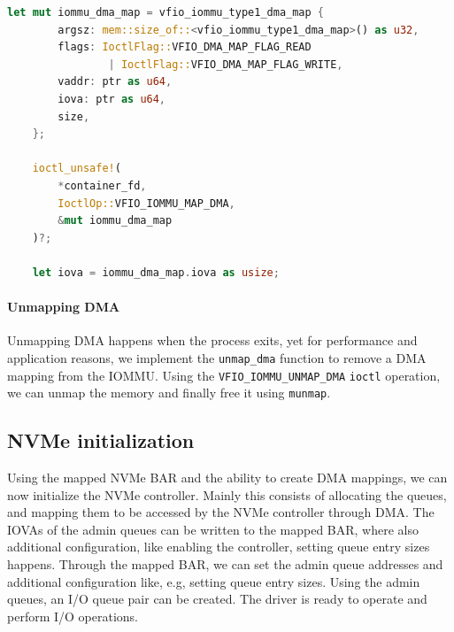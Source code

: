 \begin{minipage}{.95\linewidth}
    \begin{lstlisting}[language=Rust,caption={Mapping memory for DMA}, label=lst:mapdma]
    let mut iommu_dma_map = vfio_iommu_type1_dma_map {
        argsz: mem::size_of::<vfio_iommu_type1_dma_map>() as u32,
        flags: IoctlFlag::VFIO_DMA_MAP_FLAG_READ 
                | IoctlFlag::VFIO_DMA_MAP_FLAG_WRITE,
        vaddr: ptr as u64,
        iova: ptr as u64,
        size,
    };

    ioctl_unsafe!(
        *container_fd,
        IoctlOp::VFIO_IOMMU_MAP_DMA,
        &mut iommu_dma_map
    )?;

    let iova = iommu_dma_map.iova as usize; 
\end{lstlisting}
\end{minipage}

\paragraph{Unmapping DMA}
Unmapping DMA happens when the process exits, yet for performance and application reasons, we implement the \texttt{unmap\_dma} function to remove a DMA mapping from the IOMMU. Using the \texttt{VFIO\_IOMMU\_UNMAP\_DMA} \texttt{ioctl} operation, we can unmap the memory and finally free it using \texttt{munmap}.


\subsection{NVMe initialization}\label{sec:nvmeinit}
Using the mapped NVMe BAR and the ability to create DMA mappings, we can now initialize the NVMe controller. Mainly this consists of allocating the queues, and mapping them to be accessed by the NVMe controller through DMA. The IOVAs of the admin queues can be written to the mapped BAR, where also additional configuration, like enabling the controller, setting queue entry sizes happens. Through the mapped BAR, we can set the admin queue addresses and additional configuration like, e.g, setting queue entry sizes. Using the admin queues, an I/O queue pair can be created. The driver is ready to operate and perform I/O operations.

